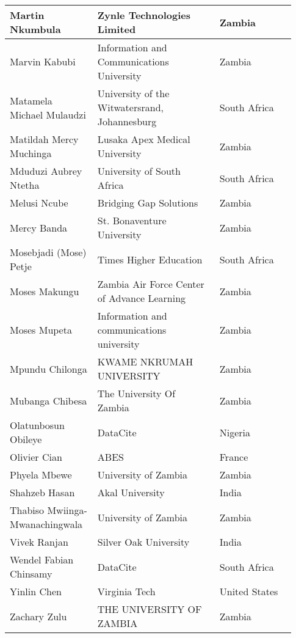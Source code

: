 \begin{center}
\begin{longtable}{p{0.28\linewidth} p{0.4\linewidth} p{0.25\linewidth}}
Martin Nkumbula & Zynle Technologies Limited & Zambia \\  \hline
Marvin Kabubi & Information and Communications University & Zambia \\  \hline
Matamela Michael Mulaudzi & University of the Witwatersrand, Johannesburg & South Africa \\  \hline
Matildah Mercy Muchinga & Lusaka Apex Medical University & Zambia \\  \hline
Mduduzi Aubrey Ntetha & University of South Africa & South Africa \\  \hline
Melusi Ncube & Bridging Gap Solutions & Zambia \\  \hline
Mercy Banda & St. Bonaventure University & Zambia \\  \hline
Mosebjadi (Mose) Petje & Times Higher Education & South Africa \\  \hline
Moses Makungu & Zambia Air Force Center of Advance Learning & Zambia \\  \hline
Moses Mupeta & Information and communications university & Zambia \\  \hline
Mpundu Chilonga & KWAME NKRUMAH UNIVERSITY & Zambia \\  \hline
Mubanga Chibesa & The University Of Zambia & Zambia \\  \hline
Olatunbosun Obileye & DataCite & Nigeria \\  \hline
Olivier Cian & ABES & France \\  \hline
Phyela Mbewe & University of Zambia & Zambia \\  \hline
Shahzeb Hasan & Akal University & India \\  \hline
Thabiso Mwiinga-Mwanachingwala & University of Zambia & Zambia \\  \hline
Vivek Ranjan & Silver Oak University & India \\  \hline
Wendel Fabian Chinsamy & DataCite & South Africa \\  \hline
Yinlin Chen & Virginia Tech & United States \\  \hline
Zachary Zulu & THE UNIVERSITY OF ZAMBIA & Zambia \\  \hline
\end{longtable}
\end{center}
